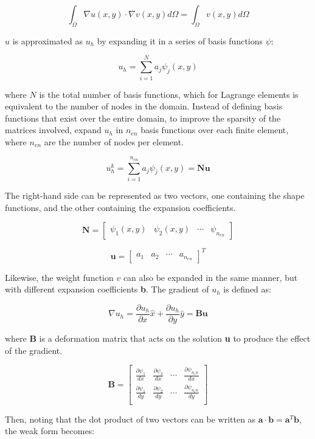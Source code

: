 \documentclass[10pt]{article}
\newcommand{\beq}{\begin{equation}}
\newcommand{\eeq}{\end{equation}}
\begin{document}
\beq
\int_\Omega \nabla u(x,y)\cdot\nabla v(x,y)d\Omega=\int_\Omega v(x,y)d\Omega
\eeq

\(u\) is approximated as \(u_h\) by expanding it in a series of basis functions \(\psi\):

\beq
u_h=\sum_{i=1}^{N}a_j\psi_j(x,y)
\eeq

where \(N\) is the total number of basis functions, which for Lagrange elements is equivalent to the number of nodes in the domain. Instead of defining basis functions that exist over the entire domain, to improve the sparsity of the matrices involved, expand \(u_h\) in \(n_{en}\) basis functions over each finite element, where \(n_{en}\) are the number of nodes per element. 

\beq
u_h^k=\sum_{i=1}^{n_{en}}a_j\psi_j(x,y)=\textbf{N}\textbf{u}
\eeq

The right-hand side can be represented as two vectors, one containing the shape functions, and the other containing the expansion coefficients. 

\beq
\textbf{N}=\begin{bmatrix} \psi_1(x,y) & \psi_2(x,y) & \cdots & \psi_{n_{en}}\end{bmatrix}
\eeq

\beq
\textbf{u}=\begin{bmatrix} a_1 & a_2 & \cdots & a_{n_{en}}\end{bmatrix}^T
\eeq

Likewise, the weight function \(v\) can also be expanded in the same manner, but with different expansion coefficients \textbf{b}. The gradient of \(u_h\) is defined as:

\beq
\nabla u_h=\frac{\partial u_h}{\partial x}\hat{x}+\frac{\partial u_h}{\partial y}\hat{y}=\textbf{B}\textbf{u}
\eeq

where \textbf{B} is a deformation matrix that acts on the solution \textbf{u} to produce the effect of the gradient. 

\beq
\textbf{B}=\begin{bmatrix}
\frac{\partial\psi_1}{dx} & \frac{\partial\psi_2}{dx} & \cdots & \frac{\partial\psi_{n_en}}{dx}\\
\frac{\partial\psi_1}{dy} & \frac{\partial\psi_2}{dy} & \cdots & \frac{\partial\psi_{n_en}}{dy}\\
\end{bmatrix}
\eeq

Then, noting that the dot product of two vectors can be written as \(\textbf{a}\cdot\textbf{b}=\textbf{a}^T\textbf{b}\), the weak form becomes:
\end{document}
